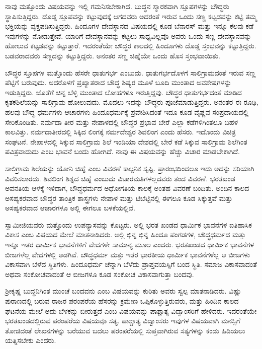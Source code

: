  ನಾವು ಮತ್ತೊಂದು ವಿಷಯವನ್ನು ಇಲ್ಲಿ ಗಮನಿಸಬೇಕಾಗಿದೆ. ಬುದ್ಧನ ಸ್ಮಾರಕವಾಗಿ ಸ್ತೂಪಗಳನ್ನು ಬೌದ್ಧರು ಸ್ಥಾಪಿಸುತ್ತಿದ್ದರು. ದೊಡ್ಡ ಸ್ತೂಪವನ್ನು ಕಟ್ಟುವುದಕ್ಕೆ ಆಗದವರು ಅದರಂತೆ ಇರುವ ಒಂದು ಸಣ್ಣ ಕಟ್ಟಡವನ್ನು ಕಟ್ಟಿ ತಮ್ಮ ಭಕ್ತಿಯನ್ನು ವ್ಯಕ್ತಪಡಿಸುತ್ತಿದ್ದರು. ಹಿಂದೂಗಳ ದೇವಸ್ಥಾನದ ವಿಷಯದಲ್ಲಿ ಕೂಡ ಬೆನಾರಸ್ ಮತ್ತು ಇನ್ನೂ ಕೆಲವು ಕಡೆ ಇವುಗಳನ್ನು ನೋಡುತ್ತೇವೆ. ಯಾರಿಗೆ ದೇವಸ್ಥಾನವನ್ನು ಕಟ್ಟಲು ಸಾಧ್ಯವಿಲ್ಲವೊ ಅವರು ಒಂದು ಸಣ್ಣ ದೇವಸ್ಥಾನವನ್ನು ಹೋಲುವ ಕಟ್ಟಡವನ್ನು ಕಟ್ಟುತ್ತಾರೆ. ಇದರಂತೆಯೇ ಬೌದ್ಧರ ಕಾಲದಲ್ಲಿ ಹಿಂದೂಗಳು ದೊಡ್ಡ ಸ್ತಂಭವನ್ನು ಕಟ್ಟುತ್ತಿದ್ದರು. ಬಡವರಾದವರು ಸಣ್ಣದನ್ನು ಕಟ್ಟುತ್ತಿದ್ದರು. ಅನಂತರ ಸಣ್ಣ ಚಿಹ್ನೆಯೇ ಒಂದು ಹೊಸ ಸ್ತಂಭವಾಯಿತು. 

 ಬೌದ್ಧರ ಸ್ತೂಪಗಳ ಮತ್ತೊಂದು ಹೆಸರೇ ಧಾತುಗರ್ಭ ಎಂಬುದು. ಧಾತುಗರ್ಭದೊಳಗೆ ಸಾಲಿಗ್ರಾಮದಂತೆ ಇರುವ ಸಣ್ಣ ಪೆಟ್ಟಿಗೆ ಬರುವುದು. ಅದರೊಳಗೆ ಪ್ರಖ್ಯಾತರಾದ ಬೌದ್ಧ ಶಿಷ್ಯರ ಮೂಳೆ ಬೂದಿ ಮುಂತಾದ ಅವಶೇಷಗಳನ್ನು ಇಡುತ್ತಿದ್ದರು. ಜೊತೆಗೆ ಚಿನ್ನ ಬೆಳ್ಳಿ ಮುಂತಾದ ಲೋಹಗಳೂ ಇರುತ್ತಿದ್ದವು. ಬೌದ್ಧರ ಧಾತುಗರ್ಭದಂತೆ ಮಾಡಿದ ಕೃತಕಶಿಲೆಯನ್ನು ಸಾಲಿಗ್ರಾಮ ಹೋಲುವುದು. ಮೊದಲು ಇದನ್ನು ಬೌದ್ಧರು ಪೂಜೆಮಾಡುತ್ತಿದ್ದರು. ಅನಂತರ ಈ ರೂಢಿ, ಹಲವು ಬೌದ್ಧ ಧರ್ಮಗಳು ಆಚಾರಗಳು ಹಿಂದೂಧರ್ಮಕ್ಕೆ ಪ್ರವೇಶಿಸಿದಂತೆ ಇದೂ ಕೂಡ ವೈಷ್ಣವ ಸಂಪ್ರದಾಯದಲ್ಲಿ ಸೇರಿಕೊಂಡಿತು. ನರ್ಮದಾ ತೀರ ಮತ್ತು ನೇಪಾಳದಲ್ಲಿ ಬೌದ್ಧರ ಪ್ರಭಾವ ಬೇರೆ ಎಲ್ಲಾ ಕಡೆಗಳಿಗಿಂತಲೂ ಬಹಳ ಕಾಲವಿತ್ತು. ನರ್ಮದಾತೀರದಲ್ಲಿ ಸಿಕ್ಕಿದ ಲಿಂಗಕ್ಕೆ ನರ್ಮದೇಶ್ವರ ಶಿವಲಿಂಗ ಎಂದು ಹೆಸರು. ಇದೊಂದು ವಿಚಿತ್ರ ಸಂಘಟನೆ. ನೇಪಾಳದಲ್ಲಿ ಸಿಕ್ಕುವ ಸಾಲಿಗ್ರಾಮ ಶಿಲೆ ಇಂಡಿಯಾ ದೇಶದಲ್ಲಿ ಬೇರೆ ಕಡೆ ಸಿಕ್ಕುವ ಸಾಲಿಗ್ರಾಮ ಶಿಲೆಗಿಂತ ಪವಿತ್ರವಾದುದು ಎಂಬ ಭಾವನೆ ಬಂದು ಹೋಗಿದೆ. ನಾವು ಈ ವಿಷಯವನ್ನು ಹೆಚ್ಚು ವಿಚಾರ ಮಾಡಬೇಕಾಗಿದೆ. 

\newpage

 ಸಾಲಿಗ್ರಾಮ ಶಿಲೆಯನ್ನು ಯೋನಿ ಚಿಹ್ನೆ ಎಂಬ ವಿವರಣೆ ಕಾಲ್ಪನಿಕ ಸೃಷ್ಟಿ. ಪ್ರಾರಂಭದಿಂದಲೂ ಇದು ಅದನ್ನು ಸರಿಯಾಗಿ ವಿವರಿಸಲಾರದು. ಶಿವಲಿಂಗ ಶಿಶ್ನದ ಚಿಹ್ನೆ ಎಂಬುದು ವಿಚಾರಮತಿಗಳಲ್ಲದವರು ತಂದ ವಿವರಣೆ. ಭರತಖಂಡ ಅವನತಿಯ ಆಳಕ್ಕೆ ಇಳಿದಾಗ, ಬೌದ್ಧಧರ್ಮದ ಅಧೋಗತಿಯ ಕಾಲಕ್ಕೆ ಅಂತಹ ವಿವರಣೆ ಬಂದಿತು. ಅಂದಿನ ಕಾಲದ ಅಸಹ್ಯಕರವಾದ ಬೌದ್ಧರ ತಾಂತ್ರಿಕ ಶಾಸ್ತ್ರಗಳು ನೇಪಾಳ ಮತ್ತು ಟಿಬೆಟ್ಟಿನಲ್ಲಿ ಈಗಲೂ ಕೂಡ ಸಿಕ್ಕುತ್ತವೆ ಮತ್ತು ಅಸಹ್ಯಕರವಾದ ಆಚಾರಗಳೂ ಅಲ್ಲಿ ಈಗಲೂ ಬಳಕೆಯಲ್ಲಿವೆ. 

 ಸ್ವಾಮೀಜಿಯವರು ಮತ್ತೊಂದು ಉಪನ್ಯಾಸವನ್ನು ಕೊಟ್ಟರು. ಅಲ್ಲಿ ಭರತ ಖಂಡದ ಧಾರ್ಮಿಕ ಭಾವನೆಗಳ ಐತಿಹಾಸಿಕ ವಿಕಾಸ ಎಂಬ ವಿಷಯದ ಮೇಲೆ ಮಾತನಾಡಿದರು. ಅಲ್ಲಿ ಭಿನ್ನ ಭಿನ್ನ ಹಿಂದೂ ಪಂಗಡಗಳ, ಬೌದ್ಧಧರ್ಮದ ಮತ್ತು ಇನ್ನೂ ಇತರ ಧಾರ್ಮಿಕ ಭಾವನೆಗಳಿಗೆ ವೇದಗಳೇ ಸಾಮಾನ್ಯ ಮೂಲ ಎಂದರು. ಭರತಖಂಡದ ಧಾರ್ಮಿಕ ಭಾವನೆಗಳ ಬೀಜಗಳೆಲ್ಲ ವೇದಗಳಲ್ಲಿ ಅಡಗಿವೆ. ಬೌದ್ಧಧರ್ಮ ಮತ್ತು ಇತರ ಭಾರತೀಯ ಧಾರ್ಮಿಕ ಭಾವನೆಗಳೆಲ್ಲ ಆ ಬೀಜಗಳು ವಿಕಾಸವಾಗಿ ಬೆಳೆದ ಸ್ಥಿತಿಗಳು. ಹಿಂದೂಧರ್ಮ ಚೆನ್ನಾಗಿ ಬೆಳೆದು ಪ್ರಾಪ್ತವಯಸ್ಸಿಗೆ ಬಂದ ಸ್ಥಿತಿ. ಸಮಾಜ ವಿಕಾಸವಾದಂತೆ ಅಥವಾ ಸಂಕೋಚವಾದಂತೆ ಆ ಬೀಜಗಳೂ ಕೂಡ ಸಂಕೋಚ ವಿಕಾಸವಾಗುತ್ತಾ ಬಂದವು. 

 ಶ‍್ರೀಕೃಷ್ಣ ಬುದ್ಧನಿಗಿಂತ ಮುಂಚೆ ಬಂದವನು ಎಂಬ ವಿಷಯವನ್ನು ಕುರಿತು ಅವರು ಸ್ವಲ್ಪ ಮಾತನಾಡಿದರು. ವಿಷ್ಣು ಪುರಾಣದಲ್ಲಿ ಬರುವ ರಾಜರ ಪರಂಪರೆಯ ಹೆಸರನ್ನು ಕ್ರಮೇಣ ಒಪ್ಪಿಕೊಳ್ಳುತ್ತಿರುವರು, ಮತ್ತು ಹಿಂದಿನ ಕಾಲದ ಘಟನೆಯ ಮೇಲೆ ಅದು ಬೆಳಕನ್ನು ಬೀರುತ್ತದೆ ಎಂಬ ವಿಷಯವನ್ನು ಪಾಶ್ಚಾತ್ಯ ವಿದ್ವಾಂಸರಿಗೆ ಹೇಳಿದರು. ಇದರಂತೆಯೇ ಭರತಖಂಡದಲ್ಲಿರುವ ಪರಂಪರೆಯ ವಿಷಯವೂ ಸತ್ಯ. ಪಾಶ್ಚಾತ್ಯ ವಿದ್ವಾಂಸರು ಇವುಗಳ ವಿಷಯವಾಗಿ ಮನಸ್ಸಿಗೆ ತೋಚಿದಂತೆ ಲೇಖನಗಳನ್ನು ಬರೆಯುವ ಬದಲು ಪರಂಪರೆಯಲ್ಲಿ ಸುಪ್ತವಾಗಿರುವ ಸತ್ಯಗಳನ್ನು ಕಂಡು ಹಿಡಿಯಲು ಯತ್ನಿಸಬೇಕು ಎಂದರು. 


